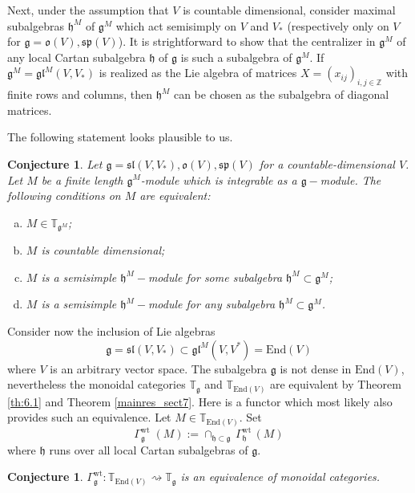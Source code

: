 \documentclass{svmult}
\newtheorem{conject}[theo]{Conjecture}
\newcommand {\ZZ} {\mathbb {Z}}
\newcommand{\TT}{\mathbb{T}}
\newcommand{\wt}{\mathrm{wt}}
\renewcommand{\sp}{\mathfrak{sp}}
\renewcommand{\sl}{\mathfrak{sl}}
\newcommand{\oo}{\mathfrak{o}}
\newcommand{\hh}{\mathfrak{h}}
\renewcommand{\gg}{\mathfrak{g}}
\newcommand{\gl}{\mathfrak{gl}}
\newcommand{\End}{\mathrm{End}}
\begin{document}
\vspace{0.33cm}

Next, under the assumption that $V$ is countable dimensional, consider maximal subalgebras $\hh^M$ of $\gg^M$ which act semisimply on $V$ and $V_*$ (respectively only on $V$ for $\gg = \oo(V), \sp(V)$). 
It is strightforward to show that the centralizer in $\gg^M$ of any local Cartan subalgebra $\hh$ of $\gg$ is such a subalgebra of $\gg^M$. 
If $\gg^M = \gl^M(V,V_*)$ is realized as the Lie algebra of matrices $X = (x_{ij})_{i,j \in \ZZ}$ with finite rows and columns, then $\hh^M$ can 
be chosen as the subalgebra of diagonal matrices.

The following statement looks plausible to us.

\begin{conject}\label{conject:1}
Let $\gg = \sl(V,V_*), \oo(V), \sp(V)$ for a countable-dimensional $V$. Let $M$ be a finite length $\gg^M$-module which is integrable as a $\gg-$module. The following conditions on $M$ are equivalent:
\begin{enumerate}[a)]
 \item $M \in \TT_{\gg^M}$;
 \item $M$ is countable dimensional;
 \item $M$ is a semisimple $\hh^M-$module for some subalgebra $\hh^M\subset \gg^M$;
  \item $M$ is a semisimple $\hh^M-$module for any subalgebra $\hh^M \subset \gg^M$.
\end{enumerate}

\end{conject} 

\vspace{0.4cm}

Consider now the inclusion of Lie algebras 
$$\gg = \sl(V,V_*) \subset \gl^M(V,V^*) = \End(V)$$
where $V$ is an arbitrary vector space. The subalgebra $\gg$ is not dense in $\End(V)$, nevertheless the monoidal categories $\TT_{\gg}$ and $\TT_{\End(V)}$ are equivalent by Theorem \ref{th:6.1} and Theorem \ref{mainres_sect7}. Here is a functor which most likely also provides such an equivalence. Let $M \in \TT_{\End(V)}$. Set 
$$\Gamma_{\gg}^\wt \;(M) := \cap_{\hh \subset \gg}\,\Gamma_{\hh}^\wt\,(M)$$
where $\hh$ runs over all local Cartan subalgebras of $\gg$.

\begin{conject}\label{conject:2}
 $\Gamma_{\gg}^\wt: \TT_{\End(V)} \rightsquigarrow \TT_{\gg}$ is an equivalence of monoidal categories.
\end{conject}
\end{document}
